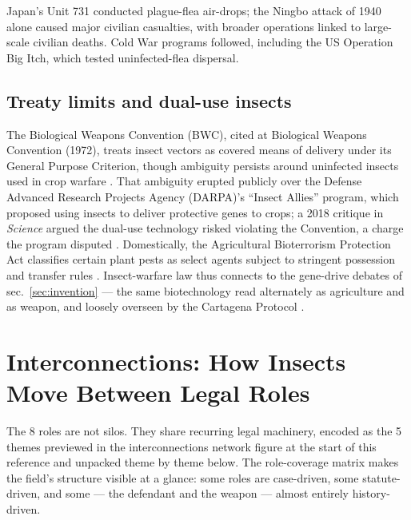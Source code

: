 \documentclass[
  english,
]{article}
\begin{document}
Japan's Unit 731 conducted plague-flea air-drops; the Ningbo attack of
1940 alone caused major civilian casualties, with broader operations
linked to large-scale civilian deaths. Cold War programs followed,
including the US Operation Big Itch, which tested uninfected-flea
dispersal.

\subsection{Treaty limits and dual-use
insects}\label{treaty-limits-and-dual-use-insects}

The Biological Weapons Convention (BWC), cited at Biological Weapons
Convention (1972), treats insect vectors as covered means of delivery
under its General Purpose Criterion, though ambiguity persists around
uninfected insects used in crop warfare \citep{bwc1972}. That ambiguity
erupted publicly over the Defense Advanced Research Projects Agency
(DARPA)'s ``Insect Allies'' program, which proposed using insects to
deliver protective genes to crops; a 2018 critique in \emph{Science}
argued the dual-use technology risked violating the Convention, a charge
the program disputed \citep{science2018insectallies}. Domestically, the
Agricultural Bioterrorism Protection Act classifies certain plant pests
as select agents subject to stringent possession and transfer rules
\citep{agbioterror2002}. Insect-warfare law thus connects to the
gene-drive debates of sec.~\ref{sec:invention} --- the same
biotechnology read alternately as agriculture and as weapon, and loosely
overseen by the Cartagena Protocol \citep{cartagena2000}.

\newpage

\section{Interconnections: How Insects Move Between Legal
Roles}\label{sec:interconnections}

The 8 roles are not silos. They share recurring legal machinery, encoded
as the 5 themes previewed in the interconnections network figure at the
start of this reference and unpacked theme by theme below. The
role-coverage matrix makes the field's structure visible at a glance:
some roles are case-driven, some statute-driven, and some --- the
defendant and the weapon --- almost entirely history-driven.
\end{document}
